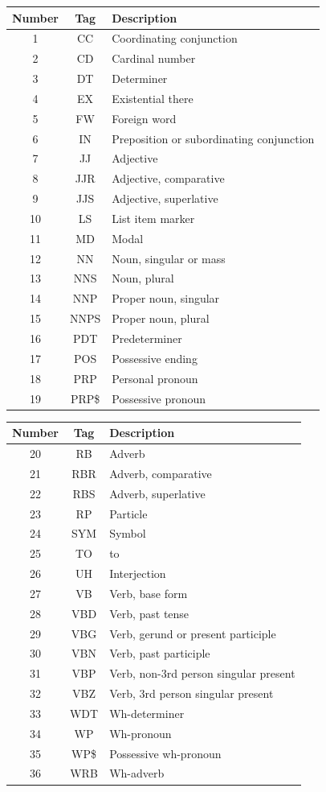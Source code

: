 \documentclass[11pt]{article}
\begin{document}
\noindent
\begin{minipage}[t][][t]{0.45\linewidth}
	\begin{tabularx}{\linewidth}{c|c|X}
		\textbf{Number} & \textbf{Tag} & \textbf{Description} \\
		\hline
		1 & CC & Coordinating conjunction \\
		2 & CD & Cardinal number \\
		3 & DT & Determiner \\
		4 & EX & Existential there \\
		5 & FW & Foreign word \\
		6 & IN & Preposition or subordinating conjunction \\
		7 & JJ & Adjective \\
		8 & JJR & Adjective, comparative \\
		9 & JJS & Adjective, superlative \\
		10 & LS & List item marker \\
		11 & MD & Modal \\
		12 & NN & Noun, singular or mass \\
		13 & NNS & Noun, plural \\
		14 & NNP & Proper noun, singular \\
		15 & NNPS & Proper noun, plural \\
		16 & PDT & Predeterminer \\
		17 & POS & Possessive ending \\
		18 & PRP & Personal pronoun \\
		19 & PRP\$ & Possessive pronoun
	\end{tabularx}
\end{minipage}
\begin{minipage}[t][][t]{0.45\linewidth}
	\begin{tabularx}{\linewidth}{c|c|X}
		\textbf{Number} & \textbf{Tag} & \textbf{Description} \\
		\hline
		20 & RB & Adverb \\
		21 & RBR & Adverb, comparative \\
		22 & RBS & Adverb, superlative \\
		23 & RP & Particle \\
		24 & SYM & Symbol \\
		25 & TO & to \\
		26 & UH & Interjection \\
		27 & VB & Verb, base form \\
		28 & VBD & Verb, past tense \\
		29 & VBG & Verb, gerund or present participle \\
		30 & VBN & Verb, past participle \\
		31 & VBP & Verb, non-3rd person singular present \\
		32 & VBZ & Verb, 3rd person singular present \\
		33 & WDT & Wh-determiner \\
		34 & WP & Wh-pronoun \\
		35 & WP\$ & Possessive wh-pronoun \\
		36 & WRB & Wh-adverb
	\end{tabularx}
\end{minipage}
\end{document}
